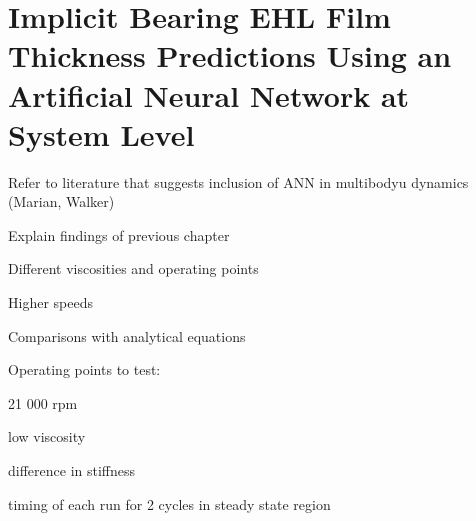 \chapter{Implicit Bearing EHL Film Thickness Predictions Using an Artificial Neural Network at System Level}
\label{ANN System Level}



Refer to literature that suggests inclusion of ANN in multibodyu dynamics (Marian, Walker)

Explain findings of previous chapter


Different viscosities and operating points

Higher speeds

Comparisons with analytical equations


Operating points to test:

21 000 rpm

low viscosity 

difference in stiffness

timing of each run for 2 cycles in steady state region